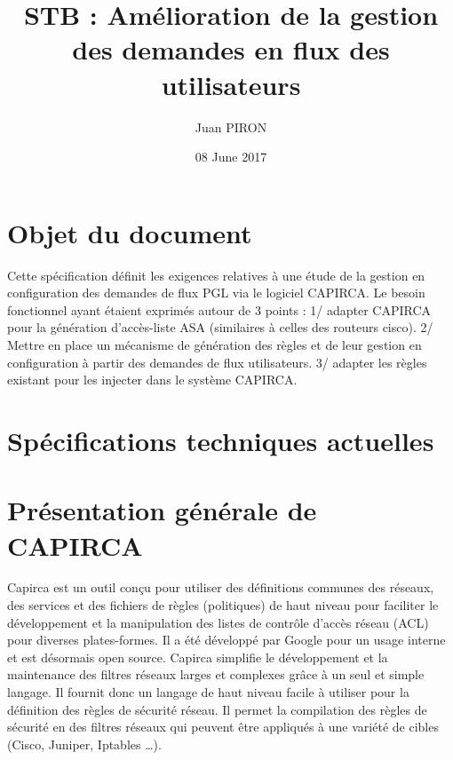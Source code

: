 \documentclass{article}
\title{STB : Amélioration de la gestion des demandes en flux des utilisateurs}
\author{Juan PIRON}
\date{08 June 2017}
\begin{document}
\maketitle
\section{Objet du document}
Cette spécification définit les exigences relatives à une étude de la gestion en configuration des demandes de flux PGL via le logiciel CAPIRCA. Le besoin fonctionnel ayant étaient exprimés autour de 3 points :
1/ adapter CAPIRCA pour la génération d’accès-liste ASA (similaires à celles des routeurs cisco).
2/ Mettre en place un mécanisme de génération des règles et de leur gestion en configuration à partir des demandes de flux utilisateurs. 
3/ adapter les règles existant pour les injecter dans le système CAPIRCA.

\maketitle
\section{Spécifications techniques actuelles}

\maketitle
\section{Présentation générale de CAPIRCA}

Capirca est un outil conçu pour utiliser des définitions communes des réseaux, des services et des fichiers de règles (politiques) de haut niveau pour faciliter le développement et la manipulation des listes de contrôle d'accès réseau (ACL) pour diverses plates-formes. Il a été développé par Google pour un usage interne et est désormais open source.
Capirca simplifie le développement et la maintenance des filtres réseaux larges et complexes grâce à un seul et simple langage. Il fournit donc un langage de haut niveau facile à utiliser pour la définition des règles de sécurité réseau. Il permet la compilation des règles de sécurité en des filtres réseaux qui peuvent être appliqués à une variété de cibles (Cisco, Juniper, Iptables …).
\end{document}
